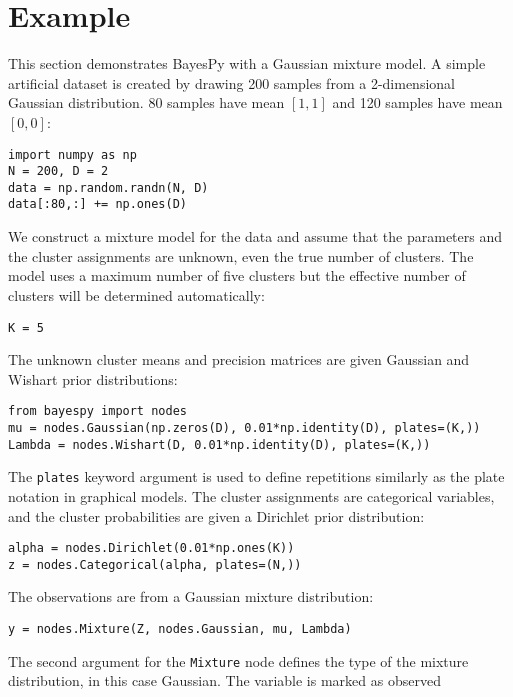 \documentclass[twoside,11pt]{article}
\begin{document}







\section{Example}

This section demonstrates BayesPy with a Gaussian mixture model.  A simple
artificial dataset is created by drawing 200 samples from a 2-dimensional
Gaussian distribution.  80 samples have mean $[1, 1]$ and 120 samples have mean
$[0, 0]$:
\begin{lstlisting}
import numpy as np
N = 200, D = 2
data = np.random.randn(N, D)
data[:80,:] += np.ones(D)
\end{lstlisting}
We construct a mixture model for the data and assume that the parameters and the
cluster assignments are unknown, even the true number of clusters.  The model
uses a maximum number of five clusters but the effective number of clusters will
be determined automatically:
\begin{lstlisting}
K = 5
\end{lstlisting}
The unknown cluster means and precision matrices are given Gaussian and Wishart
prior distributions:
\begin{lstlisting}
from bayespy import nodes
mu = nodes.Gaussian(np.zeros(D), 0.01*np.identity(D), plates=(K,))
Lambda = nodes.Wishart(D, 0.01*np.identity(D), plates=(K,))
\end{lstlisting}
The \texttt{plates} keyword argument is used to define repetitions similarly as
the plate notation in graphical models.  The cluster assignments are categorical
variables, and the cluster probabilities are given a Dirichlet prior
distribution:
\begin{lstlisting}
alpha = nodes.Dirichlet(0.01*np.ones(K))
z = nodes.Categorical(alpha, plates=(N,))
\end{lstlisting}
The observations are from a Gaussian mixture distribution:
\begin{lstlisting}
y = nodes.Mixture(Z, nodes.Gaussian, mu, Lambda)
\end{lstlisting}
The second argument for the \texttt{Mixture} node defines the type of the
mixture distribution, in this case Gaussian.  The variable is marked as observed
\end{document}
